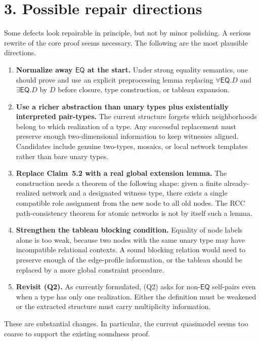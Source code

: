 \documentclass[11pt]{article}
\newcommand{\role}[1]{\ensuremath{\mathsf{#1}}}
\newcommand{\EQ}{\role{EQ}}
\begin{document}
\section*{3. Possible repair directions}

Some defects look repairable in principle, but not by minor polishing. A serious rewrite of the core proof seems necessary. The following are the most plausible directions.

\begin{enumerate}
    \item \textbf{Normalize away $\EQ$ at the start.} Under strong equality semantics, one should prove and use an explicit preprocessing lemma replacing $\forall \EQ.D$ and $\exists \EQ.D$ by $D$ before closure, type construction, or tableau expansion.

    \item \textbf{Use a richer abstraction than unary types plus existentially interpreted pair-types.} The current structure forgets which neighborhoods belong to which realization of a type. Any successful replacement must preserve enough two-dimensional information to keep witnesses aligned. Candidates include genuine two-types, mosaics, or local network templates rather than bare unary types.

    \item \textbf{Replace Claim~5.2 with a real global extension lemma.} The construction needs a theorem of the following shape: given a finite already-realized network and a designated witness type, there exists a single compatible role assignment from the new node to all old nodes. The RCC path-consistency theorem for atomic networks is not by itself such a lemma.

    \item \textbf{Strengthen the tableau blocking condition.} Equality of node labels alone is too weak, because two nodes with the same unary type may have incompatible relational contexts. A sound blocking relation would need to preserve enough of the edge-profile information, or the tableau should be replaced by a more global constraint procedure.

    \item \textbf{Revisit (Q2).} As currently formulated, (Q2) asks for non-$\EQ$ self-pairs even when a type has only one realization. Either the definition must be weakened or the extracted structure must carry multiplicity information.
\end{enumerate}

These are substantial changes. In particular, the current quasimodel seems too coarse to support the existing soundness proof.
\end{document}
